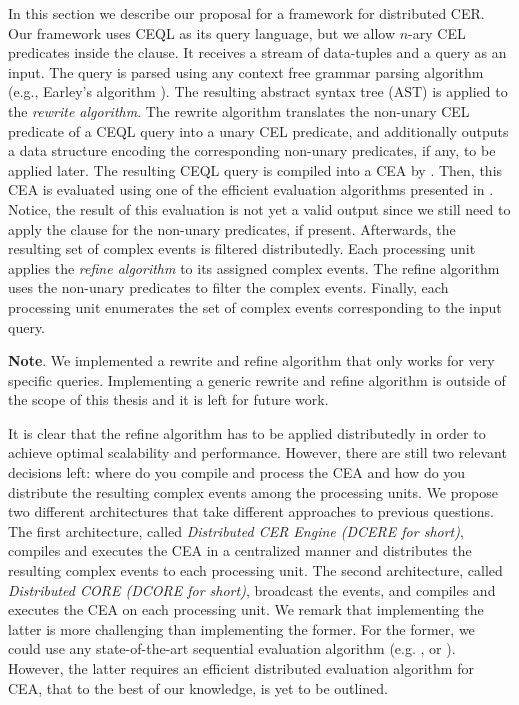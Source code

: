 In this section we describe our proposal for a framework for distributed CER. Our framework uses CEQL as its query language, but we allow $n$-ary CEL predicates inside the  clause. It receives a stream of data-tuples and a query as an input.  The query is parsed using any context free grammar parsing algorithm (e.g., Earley's algorithm \cite{earley}). The resulting abstract syntax tree (AST) is applied to the \emph{rewrite algorithm}. The rewrite algorithm translates the non-unary CEL predicate of a CEQL query into a unary CEL predicate, and additionally outputs a data structure encoding the corresponding non-unary predicates, if any, to be applied later. The resulting CEQL query is compiled into a CEA by \cite[Theorem~6.2]{formal-framework-cer}. Then, this CEA is evaluated using one of the efficient evaluation algorithms presented in \cite{formal-framework-cer, core}. Notice, the result of this evaluation is not yet a valid output since we still need to apply the  clause for the non-unary predicates, if present. Afterwards, the resulting set of complex events is filtered distributedly. Each processing unit applies the \emph{refine algorithm} to its assigned complex events. The refine algorithm uses the non-unary predicates to filter the complex events. Finally, each processing unit enumerates the set of complex events corresponding to the input query.

\textbf{Note}. We implemented a rewrite and refine algorithm that only works for very specific queries. Implementing a generic rewrite and refine algorithm is outside of the scope of this thesis and it is left for future work.

It is clear that the refine algorithm has to be applied distributedly in order to achieve optimal scalability and performance.
However, there are still two relevant decisions left: where do you compile and process the CEA and how do you distribute the resulting complex events among the processing units. We propose two different architectures that take different approaches to previous questions. The first architecture, called \emph{Distributed CER Engine (DCERE for short)}, compiles and executes the CEA in a centralized manner and distributes the resulting complex events to each processing unit. The second architecture, called \emph{Distributed CORE (DCORE for short)}, broadcast the events, and compiles and executes the CEA on each processing unit. We remark that implementing the latter is more challenging than implementing the former. For the former, we could use any state-of-the-art sequential evaluation algorithm (e.g. \cite{formal-framework-cer}, or \cite{core}). However, the latter requires an efficient distributed evaluation algorithm for CEA, that to the best of our knowledge, is yet to be outlined.

